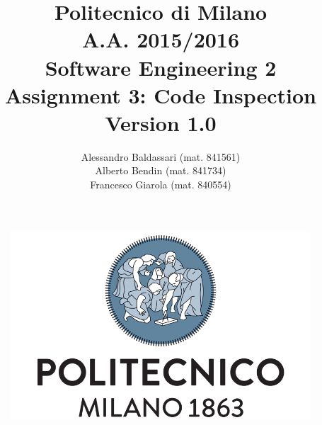 \documentclass[a4paper,11pt]{report} %
\title{Politecnico di Milano\\A.A. 2015/2016\\Software Engineering 2\\ \bigskip 
Assignment 3: Code Inspection\\
{\normalsize Version 1.0}}
\author{Alessandro Baldassari (mat. 841561) \\ Alberto Bendin (mat. 841734) \\ Francesco Giarola (mat. 840554)}
\begin{document}
	
	
	\begin{figure}[t]
		\centering
		\includegraphics[width=1\linewidth]{"Pictures/polimi-logo"}
		\label{fig:polimi-logo}
	\end{figure}
	
	\maketitle
		
	
	\thispagestyle{empty}
	\clearpage\mbox{}\clearpage

	
	
	
	\renewcommand*\thesection{\arabic{section}}
	\renewcommand*\thesubsection{\arabic{section}.\arabic{subsection}}
	\renewcommand*\thesubsubsection{%
	\arabic{section}.\arabic{subsection}.\arabic{subsubsection}%
	}
	\setcounter{secnumdepth}{4}
	\setcounter{tocdepth}{4}
		
	
	\tableofcontents
	\newpage
	
	
	
\end{document}
